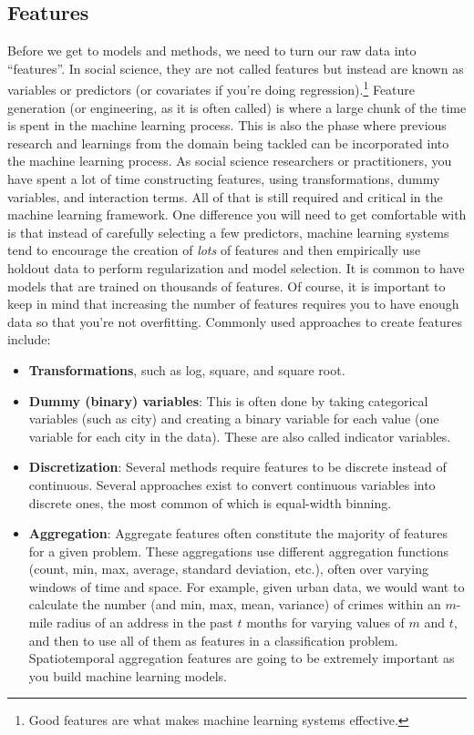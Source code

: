 \documentclass[]{krantz}
\begin{document}
\subsection{Features}\label{features}

Before we get to models and methods, we need to turn our raw data into
``features''. In social science, they are not called features but
instead are known as variables or predictors (or covariates if you're
doing regression).\footnote{Good features are what makes machine
  learning systems effective.} Feature generation (or engineering, as it
is often called) is where a large chunk of the time is spent in the
machine learning process. This is also the phase where previous research
and learnings from the domain being tackled can be incorporated into the
machine learning process. As social science researchers or
practitioners, you have spent a lot of time constructing features, using
transformations, dummy variables, and interaction terms. All of that is
still required and critical in the machine learning framework. One
difference you will need to get comfortable with is that instead of
carefully selecting a few predictors, machine learning systems tend to
encourage the creation of \emph{lots} of features and then empirically
use holdout data to perform regularization and model selection. It is
common to have models that are trained on thousands of features. Of
course, it is important to keep in mind that increasing the number of
features requires you to have enough data so that you're not
overfitting. Commonly used approaches to create features include:

\begin{itemize}
\item
  \textbf{Transformations}, such as log, square, and square root.
\item
  \textbf{Dummy (binary) variables}: This is often done by taking
  categorical variables (such as city) and creating a binary variable
  for each value (one variable for each city in the data). These are
  also called indicator variables.
\item
  \textbf{Discretization}: Several methods require features to be
  discrete instead of continuous. Several approaches exist to convert
  continuous variables into discrete ones, the most common of which is
  equal-width binning.
\item
  \textbf{Aggregation}: Aggregate features often constitute the majority
  of features for a given problem. These aggregations use different
  aggregation functions (count, min, max, average, standard deviation,
  etc.), often over varying windows of time and space. For example,
  given urban data, we would want to calculate the number (and min, max,
  mean, variance) of crimes within an \(m\)-mile radius of an address in
  the past \(t\) months for varying values of \(m\) and \(t\), and then
  to use all of them as features in a classification problem.
  Spatiotemporal aggregation features are going to be extremely
  important as you build machine learning models.
\end{itemize}
\end{document}
